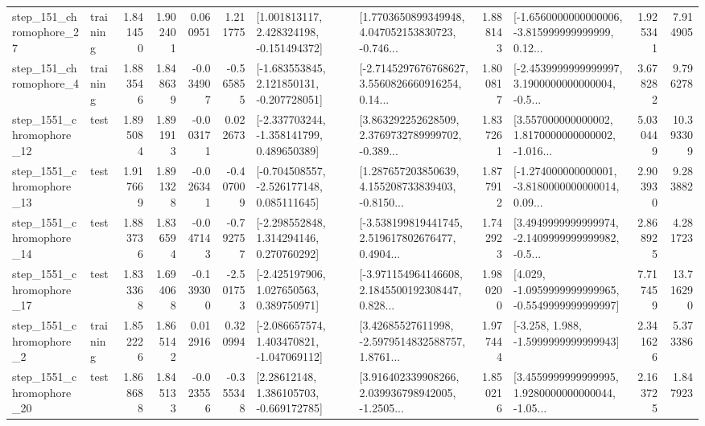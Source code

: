 \begin{tabular}{llrrrrllrlrr}
  step\_151\_chromophore\_27 &  training &      1.841450 &    1.902401 &      0.060951 &  1.211775 &    [1.001813117, 2.428324198, -0.151494372] &  [1.7703650899349948, 4.047052153830723, -0.746... &       1.888143 &  [-1.6560000000000006, -3.815999999999999, 0.12... &            1.925341 &          7.914905 \\
   step\_151\_chromophore\_4 &  training &      1.883546 &    1.848639 &     -0.034907 & -0.565855 &   [-1.683553845, 2.121850131, -0.207728051] &  [-2.7145297676768627, 3.5560826660916254, 0.14... &       1.800817 &  [-2.4539999999999997, 3.1900000000000004, -0.5... &            3.678282 &          9.796278 \\
 step\_1551\_chromophore\_12 &      test &      1.895084 &    1.891913 &     -0.003171 &  0.022673 &   [-2.337703244, -1.358141799, 0.489650389] &  [3.863292252628509, 2.3769732789999702, -0.389... &       1.837261 &  [3.557000000000002, 1.8170000000000002, -1.016... &            5.030449 &         10.393309 \\
 step\_1551\_chromophore\_13 &      test &      1.917669 &    1.891328 &     -0.026341 & -0.407009 &   [-0.704508557, -2.526177148, 0.085111645] &  [1.287657203850639, 4.155208733839403, -0.8150... &       1.877912 &  [-1.274000000000001, -3.8180000000000014, 0.09... &            2.903930 &          9.283882 \\
 step\_1551\_chromophore\_14 &      test &      1.883736 &    1.836594 &     -0.047143 & -0.792757 &    [-2.298552848, 1.314294146, 0.270760292] &  [-3.538199819441745, 2.519617802676477, 0.4904... &       1.742923 &  [3.4949999999999974, -2.1409999999999982, -0.5... &            2.868925 &          4.281723 \\
 step\_1551\_chromophore\_17 &      test &      1.833368 &    1.694068 &     -0.139300 & -2.501753 &    [-2.425197906, 1.027650563, 0.389750971] &  [-3.971154964146608, 2.1845500192308447, 0.828... &       1.980200 &  [4.029, -1.0959999999999965, -0.5549999999999997] &            7.717459 &         13.716290 \\
  step\_1551\_chromophore\_2 &  training &      1.852226 &    1.865142 &      0.012916 &  0.320994 &   [-2.086657574, 1.403470821, -1.047069112] &  [3.42685527611998, -2.5979514832588757, 1.8761... &       1.977444 &               [-3.258, 1.988, -1.5999999999999943] &            2.341626 &          5.373386 \\
 step\_1551\_chromophore\_20 &      test &      1.868688 &    1.845133 &     -0.023556 & -0.355348 &     [2.28612148, 1.386105703, -0.669172785] &  [3.916402339908266, 2.039936798942005, -1.2505... &       1.850216 &  [3.4559999999999995, 1.9280000000000044, -1.05... &            2.163725 &          1.847923 \\

\end{tabular}
